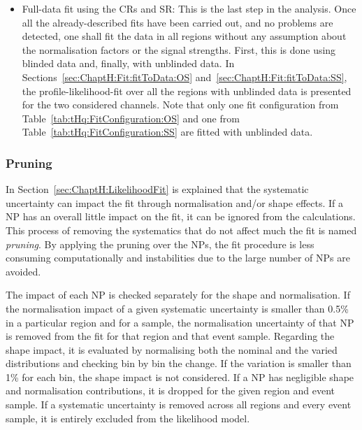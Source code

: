 \begin{itemize}
	\item Full-data fit using the CRs and SR: 
		This is the last step in the analysis. Once all the already-described fits have
		been carried out, and no problems are detected, one shall fit the data in all regions without any
		assumption about the normalisation factors or the signal strengths. First, this is done using blinded 
		data and, finally, with unblinded data. In Sections~\ref{sec:ChaptH:Fit:fitToData:OS} and~\ref{sec:ChaptH:Fit:fitToData:SS}, 
		the profile-likelihood-fit
		over all the regions with unblinded data is presented for the two considered channels.
		Note that only one fit configuration from Table~\ref{tab:tHq:FitConfiguration:OS} and
		one from Table~\ref{tab:tHq:FitConfiguration:SS} are fitted with unblinded data. 
\end{itemize}

\subsubsection{Pruning}
\label{sec:ChaptH:Fit:strategy:pruning}

In Section~\ref{sec:ChaptH:LikelihoodFit} is explained that the systematic uncertainty can impact the
fit through normalisation and/or shape effects. If a NP has an overall little impact on the fit, it can be ignored
from the calculations. 
This process of removing the systematics that do not affect much the fit is named \textit{pruning}. 
By applying the pruning over the NPs, the fit procedure is less consuming computationally and instabilities
due to the large number of NPs are avoided.

The impact of each NP is checked separately for the shape and normalisation.
If the normalisation impact of a given systematic uncertainty is smaller than 0.5\% in a particular region and for a sample,
the normalisation uncertainty of that NP is removed from the fit for that region and that event sample.
Regarding the shape impact, it is evaluated by normalising both the nominal and the varied distributions and checking bin
by bin the change. If the variation is smaller than 1\% for each bin, the shape impact is not considered.
If a NP has negligible shape and normalisation contributions, it is dropped for the given region and event sample.
If a systematic uncertainty is removed across all regions and every event sample, it is entirely excluded from the likelihood model.


